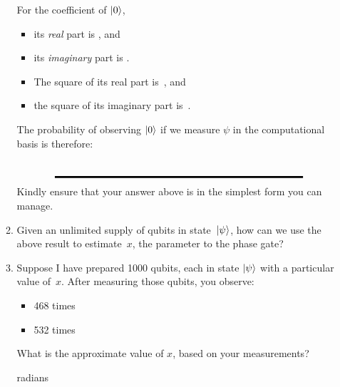 \documentclass[12pt]{article}
\begin{document}
\begin{enumerate}
\begin{enumerate}[label=\theenumi.\arabic*]
  For the coefficient of $\ket{0}$,
  \begin{itemize}
      \item its \emph{real} part is \Blank[10em]{}, and
      \item its \emph{imaginary} part is \Blank[10em]{}.
      \item The square of its real part is~\Blank[10em]{}, and
      \item the square of its imaginary part is~\Blank[10em]{}.
  \end{itemize}
  The probability of observing $\ket{0}$ if we measure $\psi$ in the computational basis is therefore:
  \[
  \Blank[25em]{}
  \]
  Kindly ensure that your answer above is in the simplest form you can manage.
  \item Given an unlimited supply of qubits in state~$\ket{\psi}$, how can we use the above result to estimate~$x$, the parameter to the phase gate?
  \LeaveSpace{}
  \item Suppose I have prepared 1000 qubits, each in state $\ket{\psi}$ with a particular value of~$x$. After measuring those qubits, you observe:
  \begin{itemize}
      \item \QZero{} 468 times
      \item \QOne{} 532 times
  \end{itemize}
  What is the approximate value of $x$, based on your measurements?
  
  \Blank{} radians
\end{enumerate}
\end{enumerate}
\end{document}
